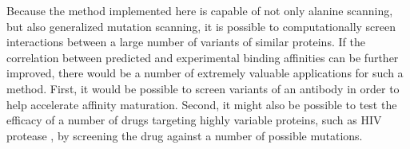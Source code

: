 Because the method implemented here is capable of not only alanine scanning, but also generalized mutation scanning, it is possible to computationally screen interactions between a large number of variants of similar proteins.
If the correlation between predicted and experimental binding affinities can be further improved, there would be a number of extremely valuable applications for such a method.
First, it would be possible to screen variants of an antibody in order to help accelerate affinity maturation.
Second, it might also be possible to test the efficacy of a number of drugs targeting highly variable proteins, such as HIV protease \cite{watkins2003selection}, by screening the drug against a number of possible mutations.

